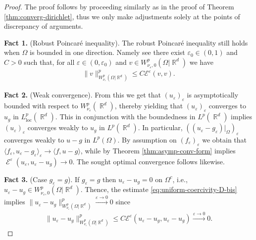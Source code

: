 \documentclass[12pt, reqno]{amsart}%
\theoremstyle{plain}  %
\theoremstyle{definition}  %
\numberwithin{equation}{section}
\DeclareMathOperator{\loc}{loc}
\DeclareMathOperator{\cE}{\mathcal{E}}
\DeclareMathOperator{\R}{\mathbb{R}}
\newcommand{\eps}{\varepsilon}
\newcommand{\WnuOmRa}{W^p_{\nu_\eps}(\Omega|\R^d )}
\newcommand{\WnuOmRao}{W^p_{\nu_\eps,0}(\Omega|\R^d)}
\begin{document}
\begin{proof}
The proof follows by  proceeding similarly  as in the proof of Theorem \ref{thm:converg-dirichlet},  thus we only make adjustments solely at the points of discrepancy of arguments.
\smallskip

\textbf{Fact 1.} (Robust Poincar\'e inequality). The robust Poincar\'e inequality still holds when $\Omega$ is bounded in one direction.  Namely see \cite[Section 10]{Fog25} there exist $\eps_0 \in (0,1)$ and $C>0$ such that, for all $\eps\in (0, \eps_0)$ and $v \in\WnuOmRao$ we have
%
\begin{align}\label{eq:uniform-coercivity-D-bis}
\|v\|^p_{\WnuOmRa}\leq C\mathcal{E}^\eps(v,v).
\end{align}

\textbf{Fact 2.} (Weak convergence). From this we get that $(u_\eps)_\eps$ is asymptotically bounded with respect to $W^p_{\nu_\eps}(\R^d)$, thereby yielding that $(u_\eps)_\eps$ converges to $u_g$ in $L^p_{\loc}(\R^d)$. This in conjunction with the boundedness  in $L^p(\R^d)$ implies  $(u_\eps)_\eps$ converges weakly to $u_g$ in $L^p(\R^d)$. In particular, $((u_\eps-g_\eps)|_\Omega)_\eps$ converges weakly to $u-g$ in $L^p(\Omega)$. By assumption on $(f_\eps)_\eps$ we obtain that $\langle f_\eps, u_\eps-g_\eps\rangle_\eps\to  \langle f, u-g\rangle $, while by Theorem \ref{thm:asymp-conv-form}  implies $\cE^\eps(u_\eps, u_\eps-u_g)\to0$. The sought optimal convergence follows likewise.

\smallskip
\textbf{Fact 3.} (Case $g_\eps=g$). If $g_\eps=g$ then  $u_\eps-u_g=0$ on $\Omega^c$, i.e., $u_\eps-u_g\in \WnuOmRao$. Thence,  the estimate  \eqref{eq:uniform-coercivity-D-bis} implies
 $\|u_\eps-u_g\|^p_{\WnuOmRa}\xrightarrow{\eps\to0}0$ since
  \begin{align*}
\|u_\eps-u_g\|^p_{\WnuOmRa}\leq C\mathcal{E}^\eps(u_\eps-u_g, u_\eps-u_g)\xrightarrow{\eps\to0}0.
\end{align*}
\end{proof}
\end{document}
